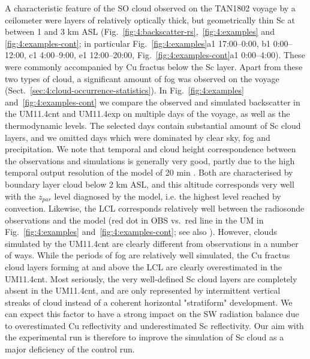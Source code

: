 A characteristic feature of the SO cloud observed on the TAN1802 voyage
by a ceilometer
were layers of relatively optically thick, but geometrically thin Sc
at between 1 and 3 km ASL (Fig.~\ref{fig:4:backscatter-rs},~\ref{fig:4:examples}
and
\ref{fig:4:examples-cont}; in particular Fig.~\ref{fig:4:examples}a1 17:00--0:00, b1 0:00--12:00, c1
4:00--9:00, e1 12:00--20:00, Fig.~\ref{fig:4:examples-cont}a1 0:00--4:00).
These were commonly accompanied by Cu fractus
below the Sc layer.
Apart from these two types of cloud, a significant amount
of fog was observed on the voyage (Sect.~\ref{sec:4:cloud-occurrence-statistics}).
In Fig.~\ref{fig:4:examples} and~\ref{fig:4:examples-cont} we compare the
observed and simulated backscatter in the UM11.4cnt and UM11.4exp on
multiple days of the voyage, as well as the thermodynamic levels.
The selected days contain substantial amount of Sc cloud layers,
and we omitted days which were dominated by clear sky, fog and precipitation.
We note that
temporal and cloud height correspondence between the observations and simulations
is generally very good, partly due to the high temporal output resolution of
the model of 20 min \citep{kuma2020b}. Both are characterised by boundary
layer cloud below 2 km ASL, and this altitude corresponds very well with
the $z_{par}$ level diagnosed by the model, i.e. the highest level reached
by convection. Likewise, the LCL corresponds relatively well between the
radiosonde observations and the model (red dot in OBS vs.~red line in the UM
in Fig.~\ref{fig:4:examples} and~\ref{fig:4:examples-cont}; see also \cite{kuma2020a}).
However, clouds simulated by the
UM11.4cnt are clearly different from observations in a number of ways.
While the periods of fog are relatively well simulated, the Cu fractus
cloud layers forming at and above the LCL are clearly overestimated in the
UM11.4cnt. Most seriously, the very well-defined Sc cloud layers are
completely absent in the UM11.4cnt, and are only represented by
intermittent vertical streaks of cloud instead of a coherent horizontal
"stratiform" development. We can expect this factor to have a strong
impact on the SW radiation balance due to overestimated Cu reflectivity
and underestimated Sc reflectivity. Our aim with the experimental run is
therefore to improve
the simulation of Sc cloud as a major deficiency of the control run.

